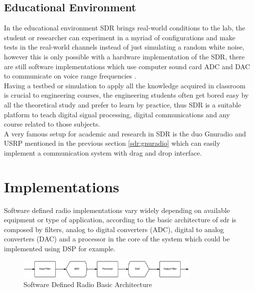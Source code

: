 \subsection{Educational Environment}

In the educational environment SDR brings real-world conditions to the lab, the
student or researcher can experiment in a myriad of configurations and make
tests in the real-world channels instead of just simulating a random white
noise, however this is only possible with a hardware implementation of the SDR,
there are still software implementations which use computer sound card ADC and
DAC to communicate on voice range frequencies \cite{ladimer2009}.\\

Having a testbed or simulation to apply all the knowledge acquired in classroom
is crucial to engineering courses, the engineering students often get bored easy
by all the theoretical study and prefer to learn by practice, thus SDR is a
suitable platform to teach digital signal processing, digital communications and
any course related to those subjects.\\

A very famous setup for academic and research in SDR is the duo Gnuradio
\cite{web:gnuradio} and USRP \cite{web:usrp} mentioned in the previous section
\ref{sdr:gnuradio} which can easily implement a communication system with drag
and drop interface\cite{akbook}.\\


\section{Implementations}
\label{sdr:implement}

Software defined radio implementations vary widely depending on available
equipment or type of application, according to \cite{ladimer2009} the basic
architecture of sdr is composed by filters, analog to digital converters (ADC),
digital to analog converters (DAC) and a processor in the core of the system
which could be implemented using DSP for example.\\

\begin{figure}[htbp]
    \centering
    \includegraphics[width=0.8\textwidth]{./figures/sdr_basic_arch}
    \caption{ Software Defined Radio Basic Architecture
    \label{fig:sdr_basic}}
\end{figure}


